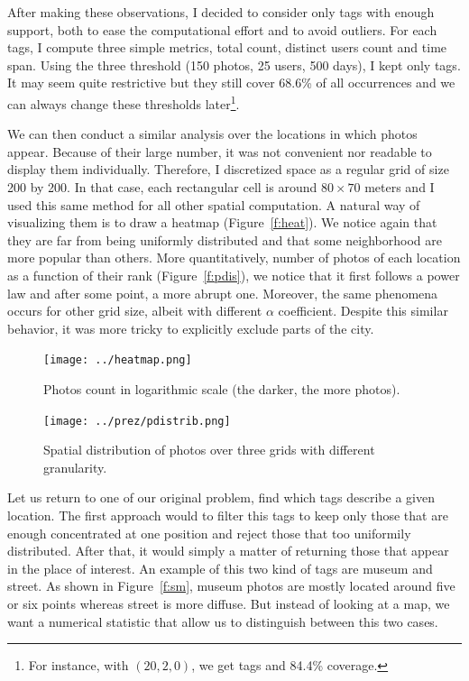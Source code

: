 After making these observations, I decided to consider only tags with enough
support, both to ease the computational effort and to avoid outliers. For each
tags, I compute three simple metrics, total count, distinct users count and
time span. Using the three threshold (150 photos, 25 users, 500 days), I kept
only  tags. It may seem quite restrictive but they still cover
68.6\% of all occurrences and we can always change these thresholds
later\footnote{For instance, with $(20, 2, 0)$, we get  tags
and 84.4\% coverage.}.

We can then conduct a similar analysis over the locations in which photos
appear. Because of their large number, it was not convenient nor readable to
display them individually. Therefore, I discretized space as a regular grid of
size 200 by 200. In that case, each rectangular cell is around $80\times 70$
meters and I used this same method for all other spatial computation. A
natural way of visualizing them is to draw a heatmap (Figure~\vref{f:heat}).
We notice again that they are far from being uniformly distributed and that
some neighborhood are more popular than others. More quantitatively, number of
photos of each location as a function of their rank (Figure~\vref{f:pdis}), we
notice that it first follows a power law and after some point, a more
abrupt one. Moreover, the same phenomena occurs for other grid size, albeit
with different $\alpha$ coefficient. Despite this similar behavior, it was
more tricky to explicitly exclude parts of the city.

\begin{figure}[hbtp]
\texttt{[image: ../heatmap.png]}
\caption{Photos count in logarithmic scale (the darker, the more
photos).\label{f:heat}}
\end{figure}

\begin{figure}[hbtp]
\texttt{[image: ../prez/pdistrib.png]}
\caption{Spatial distribution of photos over three grids with different
granularity.\label{f:pdis}}
\end{figure}

Let us return to one of our original problem, find which tags describe a given
location. The first approach would to filter this  tags to keep
only those that are enough concentrated at one position and reject those that
too uniformily distributed. After that, it would simply a matter of returning
those that appear in the place of interest. An example of this two kind of
tags are \textsf{museum} and \textsf{street}. As shown in Figure~\vref{f:sm},
\textsf{museum} photos are mostly located around five or six points whereas
\textsf{street} is more diffuse. But instead of looking at a map, we want a
numerical statistic that allow us to distinguish between this two cases.

